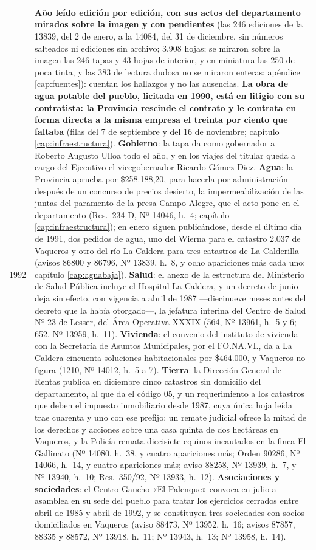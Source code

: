 \begin{longtable}{@{}p{2.7cm}p{10.3cm}@{}}
1992 & \textbf{Año leído edición por edición, con sus actos del departamento mirados sobre la imagen y con pendientes} (las 246 ediciones de la 13839, del 2 de enero, a la 14084, del 31 de diciembre, sin números salteados ni ediciones sin archivo; 3.908 hojas; se miraron sobre la imagen las 246 tapas y 43 hojas de interior, y en miniatura las 250 de poca tinta, y las 383 de lectura dudosa no se miraron enteras; apéndice \ref{cap:fuentes}): cuentan los hallazgos y no las ausencias. \textbf{La obra de agua potable del pueblo, licitada en 1990, está en litigio con su contratista: la Provincia rescinde el contrato y le contrata en forma directa a la misma empresa el treinta por ciento que faltaba} (filas del 7 de septiembre y del 16 de noviembre; capítulo \ref{cap:infraestructura}). \textbf{Gobierno}: la tapa da como gobernador a Roberto Augusto Ulloa todo el año, y en los viajes del titular queda a cargo del Ejecutivo el vicegobernador Ricardo Gómez Diez. \textbf{Agua}: la Provincia aprueba por \$258.188,20, para hacerla por administración después de un concurso de precios desierto, la impermeabilización de las juntas del paramento de la presa Campo Alegre, que el acto pone en el departamento (Res.\ 234-D, Nº 14046, h.\ 4; capítulo \ref{cap:infraestructura}); en enero siguen publicándose, desde el último día de 1991, dos pedidos de agua, uno del Wierna para el catastro 2.037 de Vaqueros y otro del río La Caldera para tres catastros de La Calderilla (avisos 86800 y 86796, Nº 13839, h.\ 8, y ocho apariciones más cada uno; capítulo \ref{cap:aguabaja}). \textbf{Salud}: el anexo de la estructura del Ministerio de Salud Pública incluye el Hospital La Caldera, y un decreto de junio deja sin efecto, con vigencia a abril de 1987 ---diecinueve meses antes del decreto que la había otorgado---, la jefatura interina del Centro de Salud Nº 23 de Lesser, del Área Operativa XXXIX (564, Nº 13961, h.\ 5 y 6; 652, Nº 13959, h.\ 11). \textbf{Vivienda}: el convenio del instituto de vivienda con la Secretaría de Asuntos Municipales, por el FO.NA.VI., da a La Caldera cincuenta soluciones habitacionales por \$464.000, y Vaqueros no figura (1210, Nº 14012, h.\ 5 a 7). \textbf{Tierra}: la Dirección General de Rentas publica en diciembre cinco catastros sin domicilio del departamento, al que da el código 05, y un requerimiento a los catastros que deben el impuesto inmobiliario desde 1987, cuya única hoja leída trae cuarenta y uno con ese prefijo; un remate judicial ofrece la mitad de los derechos y acciones sobre una casa quinta de dos hectáreas en Vaqueros, y la Policía remata diecisiete equinos incautados en la finca El Gallinato (Nº 14080, h.\ 38, y cuatro apariciones más; Orden 90286, Nº 14066, h.\ 14, y cuatro apariciones más; aviso 88258, Nº 13939, h.\ 7, y Nº 13940, h.\ 10; Res.\ 350/92, Nº 13933, h.\ 12). \textbf{Asociaciones y sociedades}: el Centro Gaucho «El Palenque» convoca en julio a asamblea en su sede del pueblo para tratar los ejercicios cerrados entre abril de 1985 y abril de 1992, y se constituyen tres sociedades con socios domiciliados en Vaqueros (aviso 88473, Nº 13952, h.\ 16; avisos 87857, 88335 y 88572, Nº 13918, h.\ 11; Nº 13943, h.\ 13; Nº 13958, h.\ 14). \\

\end{longtable}
